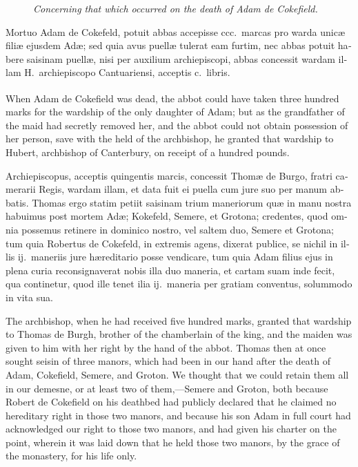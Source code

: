 \documentclass[10pt]{book}
\newcounter{engnote}
\newcommand{\engnotenum}{\textsuperscript{\arabic{engnote}\stepcounter{engnote}}}
\newcommand{\engnotetext}[1]{\vphantom{\footnotemark{}}\footnotetext{#1}}
\newcommand{\blockhead}[4][]{
\begin{figure}
\centering
\vspace{#4}
\parbox{2.75cm}{\begin{center}\footnotesize \color{BrickRed} \emph{#2}\\ #1 \end{center}}
\end{figure}
}
\begin{document}
\begin{paracol}{2}
\switchcolumn*

\begin{otherlanguage}{latin}
\blockhead{Concerning that which occurred on the death of Adam de Cokefield.}{4}{-.45cm}
Mortuo Adam de Cokefeld,\engnotetext{Cp.\ note to p.\ \oldstylenums{153}.} potuit abbas accepisse ccc.\ marcas pro warda unic\ae{} fili\ae{} ejusdem Ad\ae{}; sed quia avus puell\ae{} tulerat eam furtim, nec abbas potuit habere saisinam puell\ae{}, nisi per auxilium archiepiscopi, abbas concessit wardam illam H.\ archiepiscopo Cantuariensi, acceptis c.\ libris.

\end{otherlanguage}

\switchcolumn

When Adam de Cokefield was dead,\engnotenum{} the abbot could have taken three hundred marks for the wardship of the only daughter of Adam; but as the grandfather of the maid had secretly removed her, and the abbot could not obtain possession of her person, save with the held of the archbishop, he granted that wardship to Hubert, archbishop of Canterbury, on receipt of a hundred pounds.

\switchcolumn*

\begin{otherlanguage}{latin}
Archiepiscopus, acceptis quingentis marcis, concessit Thom\ae{} de Burgo, fratri camerarii Regis, wardam illam, et data fuit ei puella cum jure suo per manum abbatis. Thomas ergo statim petiit saisinam trium maneriorum qu\ae{} in manu nostra habuimus post mortem Ad\ae{}; Kokefeld, Semere, et Grotona; credentes, quod omnia possemus retinere in dominico nostro, vel saltem duo, Semere et Grotona; tum quia Robertus de Cokefeld, in extremis agens, dixerat publice, se nichil in illis ij.\ maneriis jure h\ae{}reditario posse vendicare, tum quia Adam filius ejus in plena curia reconsignaverat nobis illa duo maneria, et cartam suam inde fecit, qua continetur, quod ille tenet ilia ij.\ maneria per gratiam conventus, solummodo in vita sua.
\end{otherlanguage}

\switchcolumn

The archbishop, when he had received five hundred marks, granted that wardship to Thomas de Burgh, brother of the chamberlain of the king, and the maiden was given to him with her right by the hand of the abbot. Thomas then at once sought seisin of three manors, which had been in our hand after the death of Adam, Cokefield, Semere, and Groton. We thought that we could retain them all in our demesne, or at least two of them,---Semere and Groton, both because Robert de Cokefield on his deathbed had publicly declared that he claimed no hereditary right in those two manors, and because his son Adam in full court had acknowledged our right to those two manors, and had given his charter on the point, wherein it was laid down that he held those two manors, by the grace of the monastery, for his life only.


\end{paracol}
\end{document}
